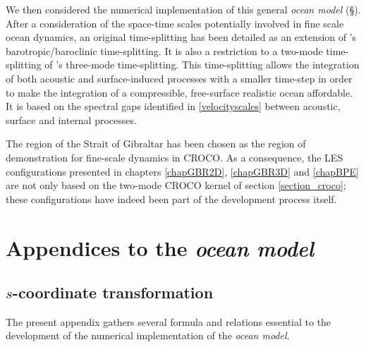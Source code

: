 We then considered the numerical implementation of this general \textit{ocean model} (\S {}). After a consideration of the space-time scales potentially involved in fine scale ocean dynamics, an original time-splitting has been detailed as an extension of \cite{shchepetkin_regional_2005}'s barotropic/baroclinic time-splitting. It is also a restriction to a two-mode time-splitting of \cite{Auclair2018}'s three-mode time-splitting. This time-splitting allows the integration of both acoustic and surface-induced processes with a smaller time-step in order to make the integration of a compressible, free-surface realistic ocean affordable. It is based on the spectral gaps identified in \ref{velocityscales} between acoustic, surface and internal processes.

The region of the Strait of Gibraltar has been chosen as the region of demonstration for fine-scale dynamics in CROCO. As a consequence, the LES configurations presented in chapters \ref{chapGBR2D}, \ref{chapGBR3D} and \ref{chapBPE} are not only based on the two-mode CROCO kernel of section \ref{section_croco}; these configurations have indeed been part of the development process itself. 

\section{Appendices to the \textit{ocean model}}
\label{annexe_ocmod}

\subsection{$s$-coordinate transformation}
\label{section_annexe2}
The present appendix gathers several formula and relations essential to the development of the numerical implementation of the \textit{ocean model}.
%
